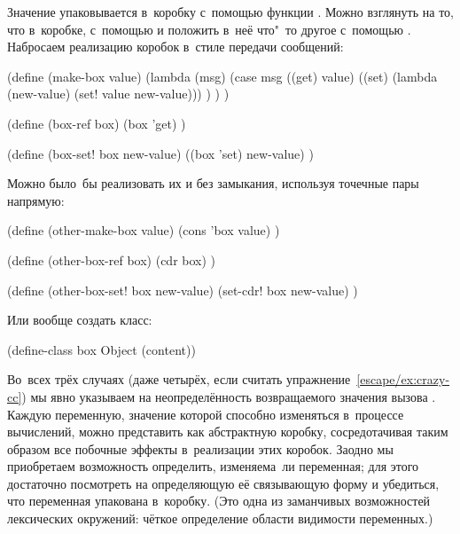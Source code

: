 Значение упаковывается в~коробку с~помощью функции . Можно
взглянуть на то, что в~коробке, с~помощью  и положить в~неё
что"~то другое с~помощью . Набросаем реализацию коробок в~стиле
передачи сообщений:

\begin{code:lisp}
(define (make-box value)
  (lambda (msg)
    (case msg
      ((get) value)
      ((set) (lambda (new-value) (set! value new-value))) ) ) )

(define (box-ref box)
  (box 'get) )

(define (box-set! box new-value)
  ((box 'set) new-value) )
\end{code:lisp}

Можно было~бы реализовать их и без замыкания, используя точечные пары напрямую:

\begin{code:lisp}
(define (other-make-box value)
  (cons 'box value) )

(define (other-box-ref box)
  (cdr box) )

(define (other-box-set! box new-value)
  (set-cdr! box new-value) )
\end{code:lisp}

Или вообще создать класс:

\begin{code:lisp}
(define-class box Object (content))
\end{code:lisp}

Во~всех трёх случаях (даже четырёх, если считать
упражнение~\ref{escape/ex:crazy-cc}) мы явно указываем на неопределённость
возвращаемого значения вызова . Каждую переменную, значение которой
способно изменяться в~процессе вычислений, можно представить как абстрактную
коробку, сосредотачивая таким образом все побочные эффекты в~реализации этих
коробок. Заодно мы приобретаем возможность определить, изменяема~ли переменная;
для этого достаточно посмотреть на определяющую её связывающую форму и
убедиться, что переменная упакована в~коробку. (Это одна из заманчивых
возможностей лексических окружений: чёткое определение области видимости
переменных.)

